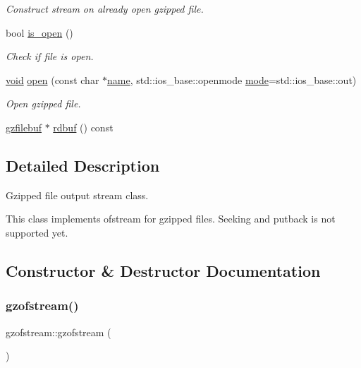 \begin{DoxyCompactItemize}
\begin{DoxyCompactList}\small\item\em Construct stream on already open gzipped file. \end{DoxyCompactList}\item 
bool \hyperlink{classgzofstream_acb1c9c6dccaf41bc5e44c2263ea48de3}{is\+\_\+open} ()
\begin{DoxyCompactList}\small\item\em Check if file is open. \end{DoxyCompactList}\item 
\hyperlink{lp__lib_8h_ac7828c7b2b31d2e11af17bdb6289c5d9}{void} \hyperlink{classgzofstream_aee3eb31f07eda7f5ad1f60d59ea4b239}{open} (const char $\ast$\hyperlink{lp__lib_8h_a2946c588fc7fa2fa5b43ac54b7872725}{name}, std\+::ios\+\_\+base\+::openmode \hyperlink{ioapi_8h_ab77191763734fbb3e515371393ccb606}{mode}=std\+::ios\+\_\+base\+::out)
\begin{DoxyCompactList}\small\item\em Open gzipped file. \end{DoxyCompactList}\item 
\hyperlink{classgzfilebuf}{gzfilebuf} $\ast$ \hyperlink{classgzofstream_a2fef74202b114357f41cfeb28f1d2acc}{rdbuf} () const
\end{DoxyCompactItemize}


\subsection{Detailed Description}
Gzipped file output stream class. 

This class implements ofstream for gzipped files. Seeking and putback is not supported yet. 

\subsection{Constructor \& Destructor Documentation}
\mbox{\label{classgzofstream_ae92ce0e4696e29741ee979f08cf5f7d2}} 
\subsubsection{\texorpdfstring{gzofstream()}{gzofstream()}\hspace{0.1cm}{\footnotesize\ttfamily [1/3]}}
{\footnotesize\ttfamily gzofstream\+::gzofstream (\begin{DoxyParamCaption}{ }\end{DoxyParamCaption})}

